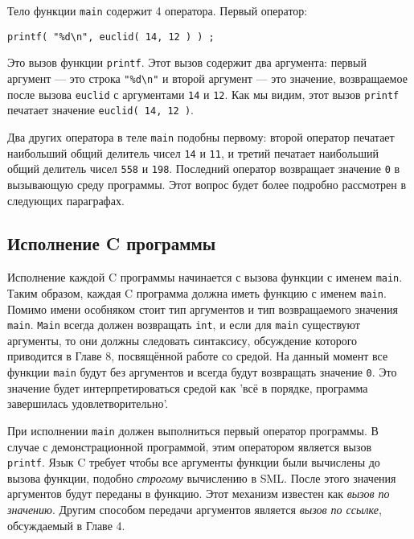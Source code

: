 Тело функции \lstinline|main| содержит 4 оператора. Первый оператор:

\begin{lstlisting}
printf( "%d\n", euclid( 14, 12 ) ) ;
\end{lstlisting}

Это вызов функции \lstinline|printf|. Этот вызов содержит два аргумента: первый аргумент --- это строка \lstinline|"%d\n"| и второй аргумент --- это значение, возвращаемое после вызова \lstinline|euclid| с аргументами \lstinline|14| и \lstinline|12|. Как мы видим, этот вызов \lstinline|printf| печатает значение \lstinline|euclid( 14, 12 )|.

Два других оператора в теле \lstinline|main| подобны первому: второй оператор печатает наибольший общий делитель чисел \lstinline|14| и \lstinline|11|, и третий печатает наибольший общий делитель чисел \lstinline|558| и \lstinline|198|. Последний оператор возвращает значение \lstinline|0| в вызывающую среду программы. Этот вопрос будет более подробно рассмотрен в следующих параграфах.

\subsection{Исполнение C программы}\label{CProgramExecute}

Исполнение каждой C программы начинается с вызова функции с именем \lstinline|main|. Таким образом, каждая C программа должна иметь функцию с именем \lstinline|main|. Помимо имени особняком стоит тип аргументов и тип возвращаемого значения \lstinline|main|. \lstinline|Main| всегда должен возвращать \lstinline|int|, и если для \lstinline|main| существуют аргументы, то они должны следовать синтаксису, обсуждение которого приводится в Главе 8, посвящённой работе со средой. На данный момент все функции \lstinline|main| будут без аргументов и всегда будут возвращать значение \lstinline|0|. Это значение будет интерпретироваться средой как 'всё в порядке, программа завершилась удовлетворительно'.

При исполнении \lstinline|main| должен выполниться первый оператор программы. В случае с демонстрационной программой, этим оператором является вызов \lstinline|printf|. Язык C требует чтобы все аргументы функции были вычислены до вызова функции, подобно \emph{строгому} вычислению в SML. После этого значения аргументов будут переданы в функцию. Этот механизм известен как \emph{вызов по значению}. Другим способом передачи аргументов является \emph{вызов по ссылке}, обсуждаемый в Главе 4.

